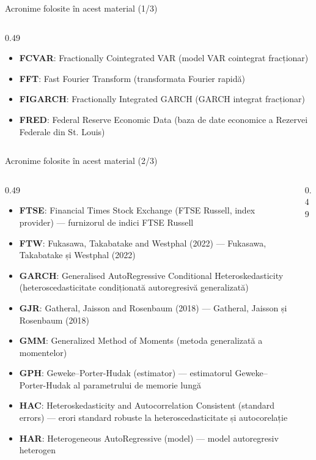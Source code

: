 \begin{frame}{Acronime folosite în acest material (1/3)}
\begin{columns}[T]
\begin{column}{0.49\textwidth}
\begin{itemize}
    \item \textbf{FCVAR}: Fractionally Cointegrated VAR (model VAR cointegrat fracționar)
    \item \textbf{FFT}: Fast Fourier Transform (transformata Fourier rapidă)
    \item \textbf{FIGARCH}: Fractionally Integrated GARCH (GARCH integrat fracționar)
    \item \textbf{FRED}: Federal Reserve Economic Data (baza de date economice a Rezervei Federale din St. Louis)
\end{itemize}
\end{column}
\end{columns}
\end{frame}
\begin{frame}{Acronime folosite în acest material (2/3)}
\begin{columns}[T]
\begin{column}{0.49\textwidth}
\begin{itemize}\setlength{\itemsep}{0pt}
    \item \textbf{FTSE}: Financial Times Stock Exchange (FTSE Russell, index provider) — furnizorul de indici FTSE Russell
    \item \textbf{FTW}: Fukasawa, Takabatake and Westphal (2022) — Fukasawa, Takabatake și Westphal (2022)
    \item \textbf{GARCH}: Generalised AutoRegressive Conditional Heteroskedasticity (heteroscedasticitate condiționată autoregresivă generalizată)
    \item \textbf{GJR}: Gatheral, Jaisson and Rosenbaum (2018) — Gatheral, Jaisson și Rosenbaum (2018)
    \item \textbf{GMM}: Generalized Method of Moments (metoda generalizată a momentelor)
    \item \textbf{GPH}: Geweke–Porter-Hudak (estimator) — estimatorul Geweke–Porter-Hudak al parametrului de memorie lungă
    \item \textbf{HAC}: Heteroskedasticity and Autocorrelation Consistent (standard errors) — erori standard robuste la heteroscedasticitate și autocorelație
    \item \textbf{HAR}: Heterogeneous AutoRegressive (model) — model autoregresiv heterogen
\end{itemize}
\end{column}
\begin{column}{0.49\textwidth}
\begin{itemize}\setlength{\itemsep}{0pt}

\end{itemize}
\end{column}
\end{columns}
\end{frame}
